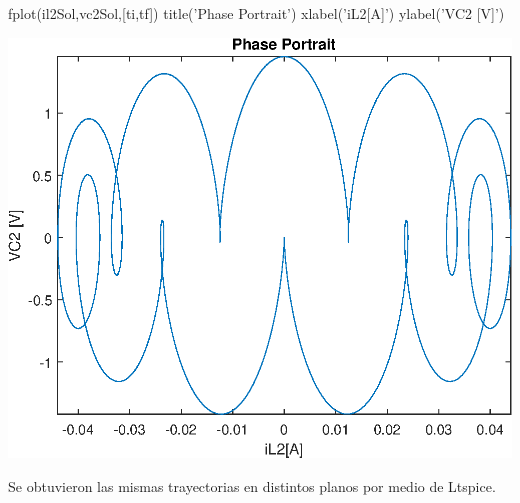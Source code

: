 \documentclass[10pt,a4paper]{article} %
\begin{document}
\begin{matlabcode}
	fplot(il2Sol,vc2Sol,[ti,tf])
	title('Phase Portrait')
	xlabel('iL2[A]')
	ylabel('VC2 [V]')
\end{matlabcode}
\begin{center}
	\includegraphics[width=\maxwidth{56.196688409433015em}]{figure_3_10}
\end{center}
Se obtuvieron las mismas trayectorias en distintos planos por medio de Ltspice.
\end{document}
